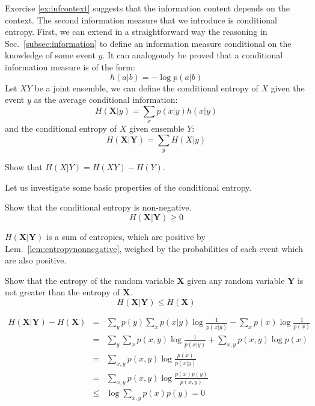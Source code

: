 Exercise \ref{ex:infcontext} suggests that the information content depends on the context. The second information measure that we introduce is conditional entropy.
First, we can extend in a straightforward way the reasoning in Sec.~\ref{subsec:information} to define an information measure conditional on the knowledge of some event $y$. 
It can analogously be proved that a conditional information measure is of the form: 
\begin{equation}
h(a|b) = -\log p (a|b)
\end{equation}
Let $XY$ be a joint ensemble, we can define the conditional entropy of $X$ given the event $y$ as the average conditional information:
\begin{equation}
H(\mathbf{X}|y) = \sum_x p(x|y) h(x|y)
\end{equation}
and the conditional entropy of $X$ given ensemble $Y$:
\begin{equation}
H(\mathbf{X}|\mathbf{Y})=\sum_yH(X|y)
\end{equation}
\begin{exercise}
Show that $H(X|Y)=H(XY)-H(Y)$.
\end{exercise}
Let us investigate some basic properties of the conditional entropy.
\begin{exercise}Show that the conditional entropy is non-negative.
\begin{equation*}
H(\mathbf{X}|\mathbf{Y}) \geq 0
\end{equation*}
\end{exercise}
\begin{solution}
$H(\mathbf{X}|\mathbf{Y})$ is a sum of entropies, which are positive by Lem.~\ref{lem:entropynonnegative}, weighed by the probabilities of each event which are also positive.
\end{solution}

\begin{exercise}
\label{lem:entgeqcond}
Show that the entropy of the random variable $\mathbf{X}$ given any random variable $\mathbf{Y}$ is not greater than the entropy of $\mathbf{X}$.
\begin{equation*}
H(\mathbf{X}|\mathbf{Y}) \leq H(\mathbf{X})
\end{equation*}
\end{exercise}
\begin{solution}
\begin{eqnarray}
H(\mathbf{X}|\mathbf{Y}) - H(\mathbf{X}) &=& \sum_{y }p(y) \sum_{x} p(x|y)\log \frac{1}{p(x|y)} - \sum_{x}p(x) \log  \frac{1}{p(x)}\nonumber \\
                         &=& \sum_{y}\sum_{x}p(x,y) \log \frac{1}{p(x|y)} + \sum_{x,y}p(x,y) \log  p(x) \nonumber \\
                         &=& \sum_{x,y}p(x,y) \log  \frac{p(x)}{p(x|y)} \nonumber \\
                         &=& \sum_{x,y}p(x,y) \log  \frac{p(x)p(y)}{p(x,y)} \nonumber \\
                         &\leq & \log \sum_{x,y} p(x) p(y) = 0
\end{eqnarray}
\end{solution}

